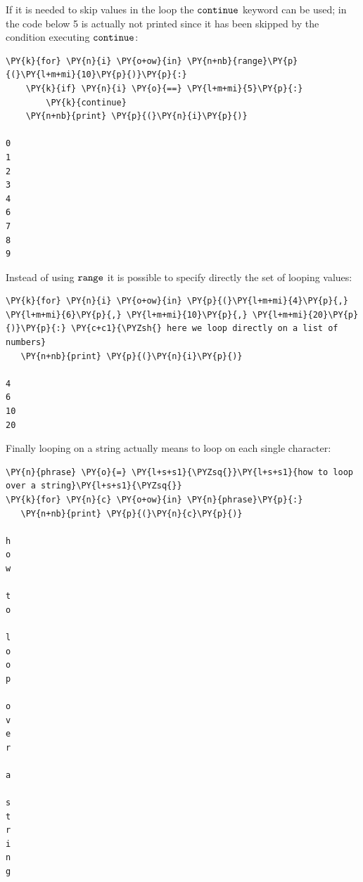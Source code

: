 If it is needed to skip values in the loop the $\tt{continue}$ keyword can be used; 
in the code below 5 is actually not printed since it has been skipped by the condition executing 
$\tt{continue}$:

\begin{tcolorbox}[breakable, size=fbox, boxrule=1pt, pad at break*=1mm, colback=cellbackground, colframe=cellborder]            
\begin{Verbatim}[commandchars=\\\{\}]
\PY{k}{for} \PY{n}{i} \PY{o+ow}{in} \PY{n+nb}{range}\PY{p}{(}\PY{l+m+mi}{10}\PY{p}{)}\PY{p}{:}
    \PY{k}{if} \PY{n}{i} \PY{o}{==} \PY{l+m+mi}{5}\PY{p}{:}
        \PY{k}{continue} 
    \PY{n+nb}{print} \PY{p}{(}\PY{n}{i}\PY{p}{)}

0
1
2
3
4
6
7
8
9
\end{Verbatim}
\end{tcolorbox}

Instead of using $\tt{range}$ it is possible to specify directly the set of looping values:

\begin{tcolorbox}[breakable, size=fbox, boxrule=1pt, pad at break*=1mm, colback=cellbackground, colframe=cellborder]            
\begin{Verbatim}[commandchars=\\\{\}]
\PY{k}{for} \PY{n}{i} \PY{o+ow}{in} \PY{p}{(}\PY{l+m+mi}{4}\PY{p}{,} \PY{l+m+mi}{6}\PY{p}{,} \PY{l+m+mi}{10}\PY{p}{,} \PY{l+m+mi}{20}\PY{p}{)}\PY{p}{:} \PY{c+c1}{\PYZsh{} here we loop directly on a list of numbers}
   \PY{n+nb}{print} \PY{p}{(}\PY{n}{i}\PY{p}{)}

4
6
10
20
\end{Verbatim}
\end{tcolorbox}

Finally looping on a string actually means to loop on each single character:
 
\begin{tcolorbox}[breakable, size=fbox, boxrule=1pt, pad at break*=1mm, colback=cellbackground, colframe=cellborder]            
\begin{Verbatim}[commandchars=\\\{\}]
\PY{n}{phrase} \PY{o}{=} \PY{l+s+s1}{\PYZsq{}}\PY{l+s+s1}{how to loop over a string}\PY{l+s+s1}{\PYZsq{}}
\PY{k}{for} \PY{n}{c} \PY{o+ow}{in} \PY{n}{phrase}\PY{p}{:}
   \PY{n+nb}{print} \PY{p}{(}\PY{n}{c}\PY{p}{)}

h
o
w
 
t
o
 
l
o
o
p
 
o
v
e
r
 
a
 
s
t
r
i
n
g
\end{Verbatim}
\end{tcolorbox}

